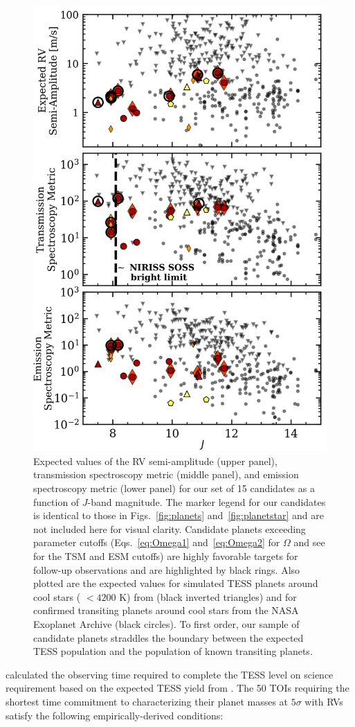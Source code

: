\begin{figure}
  \centering
  \includegraphics[width=0.6\hsize]{figures/planetsample_followup.png}
  \caption[Follow-up diagnostics for the \texttt{ORION} planet candidate sample.]
          {Expected values of the RV semi-amplitude (upper panel), transmission spectroscopy metric (middle panel),
    and emission spectroscopy metric (lower panel) for our set of 15 candidates as a function of $J$-band
    magnitude. The marker legend for our candidates is identical to those in Figs.~\ref{fig:planets}
    and~\ref{fig:planetstar} and are not included here for visual clarity. Candidate planets
    exceeding parameter cutoffs (Eqs.~\ref{eq:Omega1} and~\ref{eq:Omega2} for $\Omega$ and see \citealt{kempton18} for
    the TSM and ESM cutoffs) are highly favorable targets for follow-up observations and are highlighted by black rings.
    Also plotted are the expected values for simulated TESS planets around cool stars (\teff{} $< 4200$ K) from
    \cite{barclay18} (black inverted triangles) and for confirmed transiting planets around cool stars from the NASA
    Exoplanet Archive (black circles). To first order, our sample of candidate planets straddles the boundary
    between the expected TESS population and the population of known transiting planets.}
  \label{fig:followup}
\end{figure}

\cite{cloutier18b} calculated the observing time required to complete the TESS level on science requirement
based on the expected TESS yield from \cite{sullivan15}. The 50 TOIs requiring the shortest time
commitment to characterizing their planet masses at $5\sigma$ with RVs satisfy the following empirically-derived
conditions: 


